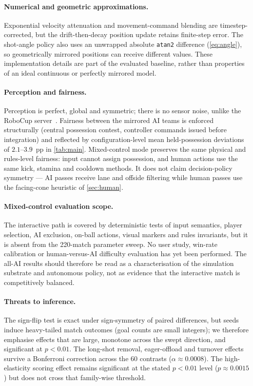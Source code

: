 \documentclass[10pt,twocolumn]{article}
\newcommand{\code}[1]{\texttt{#1}}
\begin{document}
\paragraph{Numerical and geometric approximations.} Exponential velocity
attenuation and movement-command blending are timestep-corrected, but the
drift-then-decay position update retains finite-step error. The shot-angle
policy also uses an unwrapped absolute \code{atan2} difference
(\cref{eq:angle}), so geometrically mirrored positions can receive different
values. These implementation details are part of the evaluated baseline,
rather than properties of an ideal continuous or perfectly mirrored model.

\paragraph{Perception and fairness.} Perception is perfect, global and
symmetric; there is no sensor noise, unlike the RoboCup
server~\cite{chen2003manual}. Fairness between the mirrored AI teams is
enforced structurally (central possession contest, controller commands
issued before integration) and reflected by configuration-level mean
held-possession deviations of $2.1$--$3.9$~pp in \cref{tab:main}.
Mixed-control mode preserves
the same physical and rules-level fairness: input cannot assign possession,
and human actions use the same kick, stamina and cooldown methods. It does
not claim decision-policy symmetry --- AI passes receive lane and offside
filtering while human passes use the facing-cone heuristic of
\cref{sec:human}.

\paragraph{Mixed-control evaluation scope.} The interactive path is covered
by deterministic tests of input semantics, player selection, AI exclusion,
on-ball actions, visual markers and rules invariants, but it is absent from
the 220-match parameter sweep. No user study, win-rate calibration or
human-versus-AI difficulty evaluation has yet been performed. The all-AI
results should therefore be read as a characterisation of the simulation
substrate and autonomous policy, not as evidence that the interactive match
is competitively balanced.

\paragraph{Threats to inference.} The sign-flip test is exact under
sign-symmetry of paired differences, but seeds induce heavy-tailed match
outcomes (goal counts are small integers); we therefore emphasise effects
that are large, monotone across the swept direction, and significant at
$p<0.01$. The long-shot removal, eager-offload and turnover effects survive a
Bonferroni correction across the 60 contrasts
($\alpha\approx0.0008$). The high-elasticity scoring effect remains
significant at the stated $p<0.01$ level ($p\approx0.0015$) but does not cross
that family-wise threshold.
\end{document}

